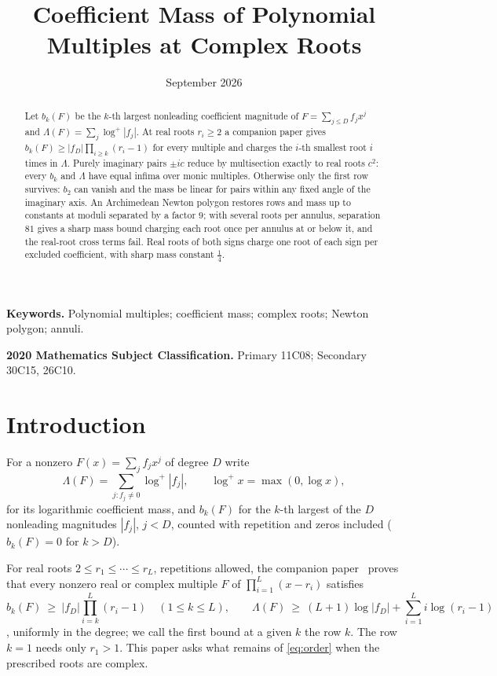 \documentclass[11pt]{article}
\title{Coefficient Mass of Polynomial Multiples at Complex Roots}
\author{\shortstack{Bangyen Pham\\
\small Independent Researcher\\
\small\href{mailto:bangyenp@gmail.com}{\texttt{bangyenp@gmail.com}}\\
\small\href{https://orcid.org/0009-0006-9928-2088}{ORCID: 0009-0006-9928-2088}}}
\date{September 2026}
\begin{document}
\maketitle

\begin{abstract}
Let $b_k(F)$ be the $k$-th largest nonleading coefficient magnitude of
$F=\sum_{j\le D}f_jx^j$ and $\Lambda(F)=\sum_j\log^+|f_j|$.  At real roots
$r_i\ge2$ a companion paper gives $b_k(F)\ge|f_D|\prod_{i\ge k}(r_i-1)$ for
every multiple and charges the $i$-th smallest root $i$ times in $\Lambda$.
Purely imaginary pairs $\pm ic$ reduce by multisection exactly to real roots
$c^2$: every $b_k$ and $\Lambda$ have equal infima over monic multiples.
Otherwise only the first row survives: $b_2$ can vanish and the mass be
linear for pairs within any fixed angle of the imaginary axis.  An
Archimedean Newton polygon restores rows and mass up to constants at moduli
separated by a factor $9$; with several roots per annulus, separation $81$
gives a sharp mass bound charging each root once per annulus at or below
it, and the real-root cross terms fail.  Real roots of both signs charge one root
of each sign per excluded coefficient, with sharp mass constant $\frac14$.
\end{abstract}

\noindent\textbf{Keywords.} Polynomial multiples; coefficient mass; complex
roots; Newton polygon; annuli.

\noindent\textbf{2020 Mathematics Subject Classification.} Primary 11C08; Secondary 30C15, 26C10.

\section{Introduction}

For a nonzero $F(x)=\sum_jf_jx^j$ of degree $D$ write
\[
  \Lambda(F)=\sum_{j:f_j\ne0}\log^+|f_j|,\qquad \log^+x=\max(0,\log x),
\]
for its logarithmic coefficient mass, and $b_k(F)$ for the $k$-th largest of
the $D$ nonleading magnitudes $|f_j|$, $j<D$, counted with repetition and
zeros included ($b_k(F)=0$ for $k>D$).

For real roots
$2\le r_1\le\cdots\le r_L$, repetitions allowed, the companion
paper~\cite{coefficient-mass} proves that every nonzero real or complex
multiple $F$ of $\prod_{i=1}^L(x-r_i)$ satisfies
\begin{equation}\label{eq:order}
  b_k(F)\ \ge\ |f_D|\prod_{i=k}^L(r_i-1)\quad(1\le k\le L),
  \qquad
  \Lambda(F)\ \ge\ (L+1)\log|f_D|+\sum_{i=1}^Li\log(r_i-1)
\end{equation}
\cite[Theorem~3.2, Corollaries~3.3 and~3.4]{coefficient-mass}, uniformly in
the degree; we call the first bound at a given $k$ the row $k$.  The row
$k=1$ needs only $r_1>1$.  This paper asks what remains of
\eqref{eq:order} when the prescribed roots are complex.
\end{document}
